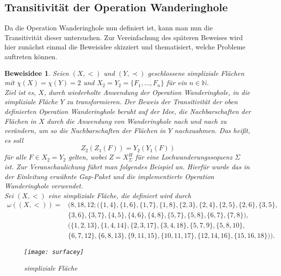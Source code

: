 \documentclass[12pt,titlepage,twoside,cleardoublepage]{article}
\theoremstyle{nummermitklammern}
\newtheorem{beweisidee}[temp]{Beweisidee}
\newtheorem{beweisidee}[zahl]{Beweisidee}
\numberwithin{equation}{section}
\begin{document}
\subsection{Transitivität der Operation Wanderinghole}
Da die Operation Wanderinghole nun definiert ist, kann man nun die Transitivität dieser untersuchen. Zur Vereinfachung des späteren Beweises wird hier zunächst einmal die Beweisidee skizziert und thematisiert, welche Probleme auftreten können.
\begin{beweisidee}
Seien $(X,<)$ und $(Y,\prec)$ geschlossene simpliziale Flächen mit $\chi(X)=\chi(Y)=2$ und $X_2=Y_2=\{F_1,\ldots, F_n\}$ für ein $n \in \mathbb{N}$.\\
Ziel ist es, $X$, durch wiederholte Anwendung der Operation Wanderinghole, in die simpliziale Fläche $Y$ zu transformieren.
Der Beweis der Transitivität der oben definierten Operation Wanderinghole beruht auf der Idee, die Nachbarschaften der Flächen in $X$ durch die Anwendung von Wanderinghole nach und nach zu verändern, um so die Nachbarschaften der Flächen in $Y$ nachzuahmen. Das heißt, es soll
\[
Z_2(Z_1(F))=Y_2(Y_1(F)) 
\]
für alle $F\in X_2=Y_2$ gelten, wobei $Z=X^H_{\Sigma}$ für eine Lochwanderungssequenz $\Sigma$ ist. Zur Veranschaulichung führt man folgendes Beispiel an. Hierfür wurde das in der Einleitung erwähnte \emph{Gap}-Paket und die implementierte Operation Wanderinghole verwendet.\\
Sei $(X,<)$ eine simpliziale Fläche, die definiert wird durch
\begin{align*}
\omega((X,<))=&(8,18,12;(\{1, 4 \}, \{ 1, 6 \}, \{ 1, 7 \}, \{ 1, 8 \}, \{ 2, 3 \}, \{ 2, 4 \}, \{ 2, 5 \},
  \{ 2, 6 \}, \{ 3, 5 \},\\
   &\{ 3, 6 \}, \{ 3, 7 \}, \{ 4, 5 \}, \{4, 6 \}, \{ 4, 8 \},
  \{ 5, 7 \}, \{ 5, 8 \}, \{ 6, 7 \}, \{ 7, 8 \}), \\
  &(\{ 1, 2, 13 \}, \{ 1, 4, 14 \}, \{ 2, 3, 17 \}, \{ 3, 4, 18 \}, \{ 5, 7, 9 \},\{ 5, 8, 10 \},\\
  & \{ 6, 7, 12 \}, \{ 6, 8, 13 \}, \{ 9, 11, 15 \}, \{ 10, 11, 17 \}, \{ 12, 14, 16 \}, \{ 15, 16, 18 \} )).
\end{align*} 

\begin{figure}[H]
\begin{center}
\texttt{[image: surfacey]}
\end{center}
\caption{simpliziale Fläche}
\end{figure}


\end{beweisidee}
\end{document}
